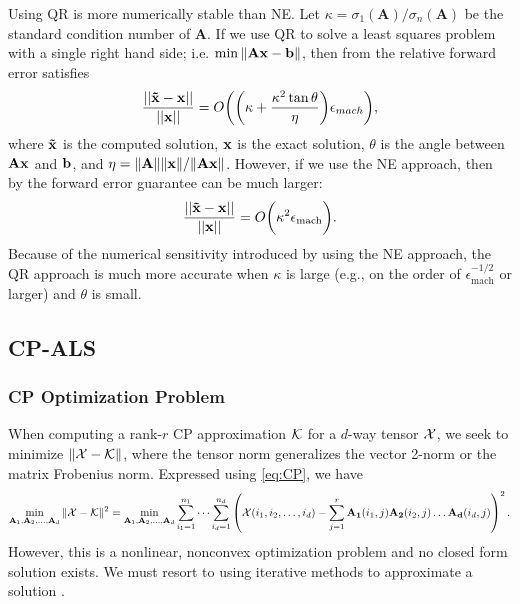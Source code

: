 \documentclass{article}
\newcommand{\mat}[1]{\mathbf{#1}}
\newcommand{\V}[2][]{\bm{#1{\mathbf{\MakeLowercase{#2}}}}} 		%
\newcommand{\T}[2][]{#1{\mathbf{\cal{#2}}}} 						%
\begin{document}
Using QR is more numerically stable than NE. 
Let $\kappa = \sigma_1(\mat{A})/\sigma_n(\mat{A})$ be the standard condition number of $\mat{A}$.
If we use QR to solve a least squares problem with a single right hand side; i.e. $\min\|\mat{A}\V{x} - \V{b} \|$, then from \cite[Eq. (19.2)]{trefethen1997numerical} the relative forward error satisfies
\begin{equation}\label{eq:ne-ferr}
  \frac{||\V[\tilde]{x} - \V{x}||}{||\V{x}||} = O \biggl(\biggl(\kappa + \frac{\kappa^2\tan\theta}{\eta}\biggr)\epsilon_{mach}\biggr),
\end{equation}
where $\V[\tilde]{x}$ is the computed solution, $\V{x}$ is the exact solution, $\theta$ is the angle between $\mat{A}\V{x}$ and $\V{b}$, and $\eta = \|\mat{A}\|\|\V{x}\|/\|\mat{A}\V{x}\|$.
However, if we use the NE approach, then by \cite[Eq. (19.3)]{trefethen1997numerical} the forward error guarantee can be much larger: 
\begin{equation}\label{eq:qr-ferr}
  \frac{||\V[\tilde]{x} - \V{x}||}{||\V{x}||} = O \biggl(\kappa^2 \epsilon_{\text{mach}}\biggr).
\end{equation}
Because of the numerical sensitivity introduced by using the NE approach, the QR approach is much more accurate when $\kappa$ is large (e.g., on the order of $\epsilon_{\text{mach}}^{-1/2}$ or larger) and $\theta$ is small.


\subsection{CP-ALS} \label{sec:cp-als}

\subsubsection{CP Optimization Problem}

When computing a rank-$r$ CP approximation $\T{K}$ for a $d$-way tensor $\T{X}$, we seek to minimize $\| \T{X} - \T{K} \|$, where the tensor norm generalizes the vector 2-norm or the matrix Frobenius norm.
Expressed using \cref{eq:CP}, we have  
$$\min_{\mat{A}_1,\mat{A}_2, \dots,\mat{A}_d} \| \T{X} - \T{K} \|^2 = \min_{\mat{A}_1,\mat{A}_2, \dots,\mat{A}_d} \sum_{i_1=1}^{n_1} \cdots \sum_{i_d=1}^{n_d} \left(\T{X}(i_1,i_2,\dots, i_d) - \sum^{r}_{j=1} \mat{A_1}(i_1,j)\mat{A_2}(i_2,j) \dots \mat{A_d}(i_d,j) \right)^2. $$
However, this is a nonlinear, nonconvex optimization problem and no closed form solution exists. 
We must resort to using iterative methods to approximate a solution \cite{kolda2009tensor}.
\end{document}
